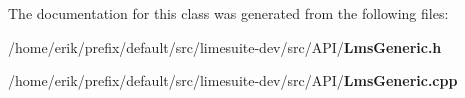 The documentation for this class was generated from the following files\+:\begin{DoxyCompactItemize}
\item 
/home/erik/prefix/default/src/limesuite-\/dev/src/\+A\+P\+I/{\bf Lms\+Generic.\+h}\item 
/home/erik/prefix/default/src/limesuite-\/dev/src/\+A\+P\+I/{\bf Lms\+Generic.\+cpp}\end{DoxyCompactItemize}
